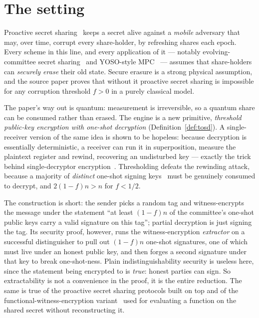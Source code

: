 \documentclass{aicr-conjecture}
\begin{document}
\section{The setting}\label{sec:setting}

Proactive secret sharing~\cite{OY91,HJKY95} keeps a secret alive
against a \emph{mobile} adversary that may, over time, corrupt every
share-holder, by refreshing shares each epoch. Every scheme in this
line, and every application of it --- notably evolving-committee
secret sharing~\cite{BGG+20} and YOSO-style MPC~\cite{GHK+21} ---
assumes that share-holders can \emph{securely erase} their old state.
Secure erasure is a strong physical assumption, and the source paper
proves that without it proactive secret sharing is impossible for any
corruption threshold $f > 0$ in a purely classical model.

The paper's way out is quantum: measurement is irreversible, so a
quantum share can be consumed rather than erased. The engine is a new
primitive, \emph{threshold public-key encryption with one-shot
decryption} (Definition~\ref{def:tosd}). A single-receiver version of
the same idea is shown to be hopeless: because decryption is
essentially deterministic, a receiver can run it in superposition,
measure the plaintext register and rewind, recovering an undisturbed
key --- exactly the trick behind single-decryptor
encryption~\cite{GZ20}. Thresholding defeats the rewinding attack,
because a majority of \emph{distinct} one-shot signing
keys~\cite{AGKZ20,SZ25,HV25} must be genuinely consumed to decrypt,
and $2(1-f)n > n$ for $f < 1/2$.

The construction is short: the sender picks a random tag and
witness-encrypts~\cite{GGSW13} the message under the statement ``at
least $(1-f)n$ of the committee's one-shot public keys carry a valid
signature on this tag''; partial decryption is just signing the tag.
Its security proof, however, runs the witness-encryption
\emph{extractor} on a successful distinguisher to pull out $(1-f)n$
one-shot signatures, one of which must live under an honest public
key, and then forges a second signature under that key to break
one-shot-ness. Plain indistinguishability security is useless here,
since the statement being encrypted to is \emph{true}: honest parties
can sign. So extractability is not a convenience in the proof, it is
the entire reduction. The same is true of the proactive secret sharing
protocols built on top and of the functional-witness-encryption
variant~\cite{BCP14} used for evaluating a function on the shared
secret without reconstructing it.
\end{document}

